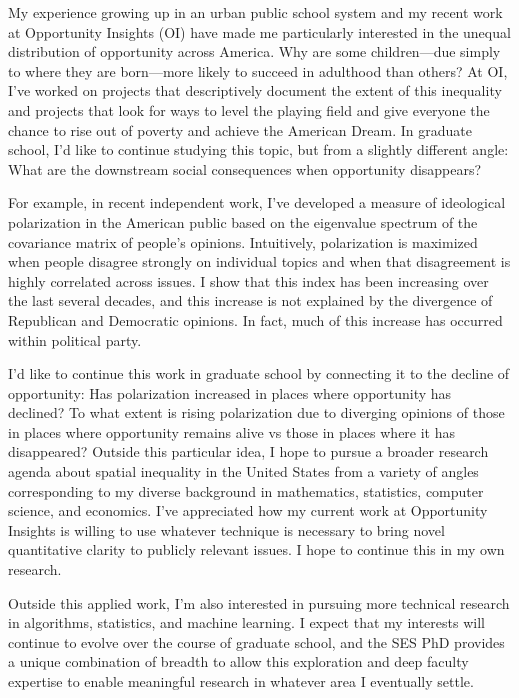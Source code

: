 \documentclass[header=false]{grad-statement}
\begin{document}
My experience growing up in an urban public school system and my recent work at Opportunity Insights (OI) have made me particularly interested in the unequal distribution of opportunity across America.
Why are some children---due simply to where they are born---more likely to succeed in adulthood than others?
At OI, I've worked on projects that descriptively document the extent of this inequality and projects that look for ways to level the playing field and give everyone the chance to rise out of poverty and achieve the American Dream.
%
In graduate school, I'd like to continue studying this topic, but from a slightly different angle:
What are the downstream social consequences when opportunity disappears?

For example, in recent independent work, I've developed a measure of ideological polarization in the American public based on the eigenvalue spectrum of the covariance matrix of people's opinions.
Intuitively, polarization is maximized when people disagree strongly on individual topics and when that disagreement is highly correlated across issues.
I show that this index has been increasing over the last several decades, and this increase is not explained by the divergence of Republican and Democratic opinions. In fact, much of this increase has occurred within political party.

I'd like to continue this work in graduate school by connecting it to the decline of opportunity:
Has polarization increased in places where opportunity has declined?
To what extent is rising polarization due to diverging opinions of those in places where opportunity remains alive vs those in places where it has disappeared?
Outside this particular idea, I hope to pursue a broader research agenda about spatial inequality in the United States from a variety of angles corresponding to my diverse background in mathematics, statistics, computer science, and economics.
I've appreciated how my current work at Opportunity Insights is willing to use whatever technique is necessary to bring novel quantitative clarity to publicly relevant issues.
I hope to continue this in my own research.

Outside this applied work, I'm also interested in pursuing more technical research in algorithms, statistics, and machine learning.
I expect that my interests will continue to evolve over the course of graduate school, and the SES PhD provides a unique combination of breadth to allow this exploration and deep faculty expertise to enable meaningful research in whatever area I eventually settle.
\end{document}
